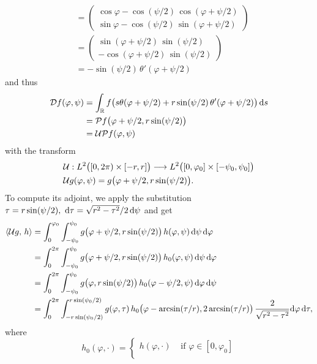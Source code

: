 \documentclass{amsart}
\renewcommand*{\phi}{\varphi}
\begin{document}
\begin{example}
\begin{align*}
  &=
  \begin{pmatrix}
   \cos\phi - \cos(\psi/2)\, \cos(\phi + \psi/2) \\
   \sin\phi - \cos(\psi/2)\, \sin(\phi + \psi/2)
  \end{pmatrix} \\
  &=
  \begin{pmatrix}
   \sin(\phi + \psi/2)\, \sin(\psi/2) \\
   -\cos(\phi + \psi/2)\, \sin(\psi/2)
  \end{pmatrix} \\
  &= -\sin(\psi/2)\, \theta'(\phi + \psi/2)
 \end{align*}
 and thus 
 \begin{align*}
  \OPD f(\phi, \psi)
  &= \int_\RR f\big(s \theta(\phi + \psi/2) + r \sin(\psi/2)\, \theta'(\phi + \psi/2) \big)\, \D s \\
  &= \OPP f\big(\phi + \psi/2, r\sin(\psi/2)\big) \\
  &= \OPU \OPP f(\phi, \psi)
 \end{align*}
 with the transform
 \begin{align}
  &\OPU: L^2\big([0,2\pi) \times [-r,r]\big) \Lto L^2\big([0,\phi_0] \times [-\psi_0,\psi_0]\big) \notag \\
  \label{eq:fanbeam_unit_trafo}
  &\OPU g(\phi, \psi) = g\big(\phi + \psi/2, r\sin(\psi/2)\big).
 \end{align} 
 To compute its adjoint, we apply the substitution $\tau = r\sin(\psi/2),\ \mathrm{d}\tau = \sqrt{r^2-\tau^2} / 2\, \mathrm{d} \psi$ and get
 \begin{align*}
  \INNER{\OPU g}{h} 
  &= \int_0^{\phi_0} \int_{-\psi_0}^{\psi_0} g\big(\phi + \psi/2, r\sin(\psi/2)\big)\, h(\phi, \psi)\, \D\psi\, \D\phi \\
  &= \int_0^{2\pi} \int_{-\psi_0}^{\psi_0} g\big(\phi + \psi/2, r\sin(\psi/2)\big)\, h_0(\phi, \psi)\, \D\psi\, \D\phi \\
  &= \int_0^{2\pi} \int_{-\psi_0}^{\psi_0} g\big(\phi, r\sin(\psi/2)\big)\, h_0(\phi - \psi/2, \psi)\, \D\phi\, \D\psi \\
  &= \int_0^{2\pi} \int_{-r\sin(\psi_0/2)}^{r\sin(\psi_0/2)} g(\phi, \tau)\, h_0\big(\phi - \arcsin(\tau/r), 2\arcsin(\tau/r)\big)\, 
  \frac{2}{\sqrt{r^2-\tau^2}} \D\phi\, \D\tau,
 \end{align*}
 where
 \begin{equation*}
  h_0(\phi, \cdot) =
  \begin{cases}
   h(\phi, \cdot) & \text{ if } \phi \in [0,\phi_0] \\

\end{cases}
\end{equation*}
\end{example}
\end{document}
